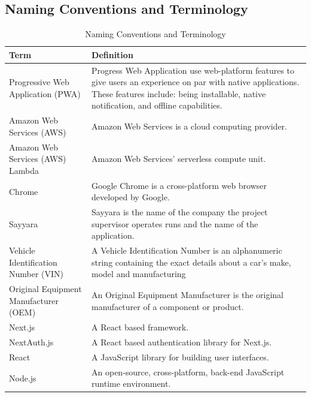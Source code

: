 \documentclass[12pt]{article}
\begin{document}
\subsection{Naming Conventions and Terminology}
\begin{table}[H]
	\caption{Naming Conventions and Terminology}
	\centering
	\begin{tabular}{ |p{5cm}|p{10.5cm}|  }
		\hline
		\textbf{Term}                         & \textbf{Definition}                                                      \\
		\hline
		Progressive Web Application (PWA)     & Progress Web Application use web-platform features to give
		users an experience on par with native applications. These features include: being installable,
		native notification, and offline capabilities.                                                                   \\
		\hline
		Amazon Web Services (AWS)             & Amazon Web Services is a cloud computing provider.                       \\
		\hline
		Amazon Web Services (AWS) Lambda      & Amazon Web Services' serverless compute unit.                            \\
		\hline
		Chrome                                & Google Chrome is a cross-platform web browser developed by Google.       \\
		\hline
		Sayyara                               & Sayyara is the name of the company the project
		supervisor operates runs and the name of the application.                                                        \\
		\hline
		Vehicle Identification Number (VIN)   & A Vehicle Identification Number is an alphanumeric string
		containing the exact details about a car's make, model and manufacturing                                         \\
		\hline
		Original Equipment Manufacturer (OEM) & An Original Equipment Manufacturer is the original
		manufacturer of a component or product.                                                                          \\
		\hline
		Next.js                               & A React based framework.                                                 \\
		\hline
		NextAuth.js                           & A React based authentication library for Next.js.                        \\
		\hline
		React                                 & A JavaScript library for building user interfaces.                       \\
		\hline
		Node.js                               & An open-source, cross-platform, back-end JavaScript runtime environment. \\
		\hline
	\end{tabular}
\end{table}
\end{document}
